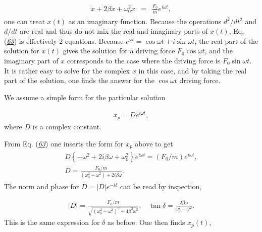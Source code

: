 \documentclass[letterpaper,10pt,english]{sphinxmanual}
\begin{document}
\begin{equation*}
\begin{split}
\begin{eqnarray}
\label{eq:compdrive} \tag{63}
\ddot{x}+2\beta\dot{x}+\omega_0^2x&=&\frac{F_0}{m}e^{i\omega t},
\end{eqnarray}
\end{split}
\end{equation*}
one can treat \(x(t)\) as an imaginary function. Because the operations
\(d^2/dt^2\) and \(d/dt\) are real and thus do not mix the real and
imaginary parts of \(x(t)\), Eq. ({\hyperref[\detokenize{chapter1:eq:compdrive}]{\emph{63}}}) is effectively 2
equations. Because \(e^{\omega t}=\cos\omega t+i\sin\omega t\), the real
part of the solution for \(x(t)\) gives the solution for a driving force
\(F_0\cos\omega t\), and the imaginary part of \(x\) corresponds to the
case where the driving force is \(F_0\sin\omega t\). It is rather easy
to solve for the complex \(x\) in this case, and by taking the real part
of the solution, one finds the answer for the \(\cos\omega t\) driving
force.

We assume a simple form for the particular solution




\begin{equation*}
\begin{split}
\begin{equation}
x_p=De^{i\omega t},
\label{_auto47} \tag{64}
\end{equation}
\end{split}
\end{equation*}
where \(D\) is a complex constant.

From Eq. ({\hyperref[\detokenize{chapter1:eq:compdrive}]{\emph{63}}}) one inserts the form for \(x_p\) above to get
\begin{equation*}
\begin{split}
\begin{eqnarray}
D\left\{-\omega^2+2i\beta\omega+\omega_0^2\right\}e^{i\omega t}=(F_0/m)e^{i\omega t},\\
\nonumber
D=\frac{F_0/m}{(\omega_0^2-\omega^2)+2i\beta\omega}.
\end{eqnarray}
\end{split}
\end{equation*}
The norm and phase for \(D=|D|e^{-i\delta}\) can be read by inspection,




\begin{equation*}
\begin{split}
\begin{equation}
|D|=\frac{F_0/m}{\sqrt{(\omega_0^2-\omega^2)^2+4\beta^2\omega^2}},~~~~\tan\delta=\frac{2\beta\omega}{\omega_0^2-\omega^2}.
\label{_auto48} \tag{65}
\end{equation}
\end{split}
\end{equation*}
This is the same expression for \(\delta\) as before. One then finds \(x_p(t)\),
\end{document}
